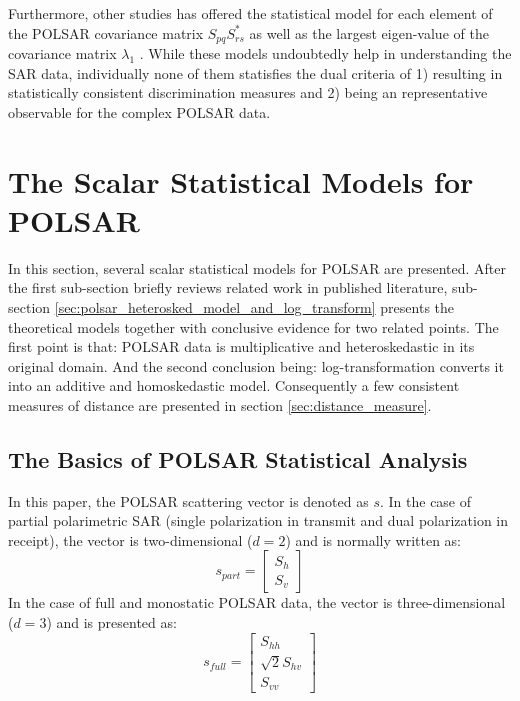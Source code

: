 \documentclass[journal]{IEEEtran}
\begin{document}
Furthermore, other studies has offered
  the statistical model for
  each element of the POLSAR covariance matrix $S_{pq}S_{rs}^*$ \cite{Lopez-Martinez_2003_TGRS_2232}
  as well as the largest eigen-value of the covariance matrix $\lambda_1$ \cite{Erten_2012_Sensors_2766}.
While these models undoubtedly help in understanding the SAR data,
  individually none of them statisfies the dual criteria of
  1) resulting in statistically consistent discrimination measures and
  2) being an representative observable for the complex POLSAR data.

\section{The Scalar Statistical Models for POLSAR}  
\label{sec:theoretical_model}

In this section, several scalar statistical models for POLSAR are presented.
After the first sub-section briefly reviews related work in published literature,
  sub-section \ref{sec:polsar_heterosked_model_and_log_transform} presents the theoretical models together with conclusive evidence for two related points.
The first point is that: POLSAR data is multiplicative and heteroskedastic in its original domain.
And the second conclusion being: log-transformation converts it into an additive and homoskedastic model.
Consequently a few consistent measures of distance are presented in section \ref{sec:distance_measure}.

\subsection{The Basics of POLSAR Statistical Analysis}

In this paper, the POLSAR scattering vector is denoted as $s$.
In the case of partial polarimetric SAR (single polarization in transmit and dual polarization in receipt),
  the vector is two-dimensional ($d=2$) and is normally written as: 
\begin{equation}
s_{part}=\begin{bmatrix}
S_h\\ 
S_v
\end{bmatrix}
\end{equation}
In the case of full and monostatic POLSAR data,
  the vector is three-dimensional ($d=3$) and is presented as:
\begin{equation}
s_{full}=\begin{bmatrix}
S_{hh}\\
\sqrt{2}S_{hv}\\
S_{vv}
\end{bmatrix}
\end{equation}
\end{document}
